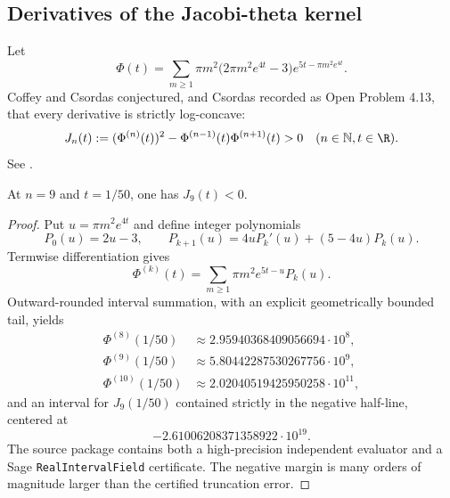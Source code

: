 \subsection{Derivatives of the Jacobi-theta kernel}

Let
\[
\Phi(t)=\sum_{m\ge1}\pi m^2\bigl(2\pi m^2e^{4t}-3\bigr)e^{5t-\pi m^2e^{4t}}.
\]
Coffey and Csordas conjectured, and Csordas recorded as Open Problem 4.13, that every derivative is strictly log-concave:
\[
J_n(t):=(\Phi^{(n)}(t))^2-\Phi^{(n-1)}(t)\Phi^{(n+1)}(t)>0
\quad(n\in\mathbb N,t\in\R).
\]
See \cite{Csordas2014}.

\begin{theorem}\label{thm:theta}
At $n=9$ and $t=1/50$, one has $J_9(t)<0$.
\end{theorem}
\begin{proof}
Put $u=\pi m^2e^{4t}$ and define integer polynomials
\[
P_0(u)=2u-3,\qquad P_{k+1}(u)=4uP_k'(u)+(5-4u)P_k(u).
\]
Termwise differentiation gives
\[
\Phi^{(k)}(t)=\sum_{m\ge1}\pi m^2e^{5t-u}P_k(u).
\]
Outward-rounded interval summation, with an explicit geometrically bounded tail, yields
\begin{align*}
\Phi^{(8)}(1/50)&\approx 2.95940368409056694\cdot10^8,\\
\Phi^{(9)}(1/50)&\approx 5.80442287530267756\cdot10^9,\\
\Phi^{(10)}(1/50)&\approx 2.02040519425950258\cdot10^{11},
\end{align*}
and an interval for $J_9(1/50)$ contained strictly in the negative half-line, centered at
\[
-2.61006208371358922\cdot10^{19}.
\]
The source package contains both a high-precision independent evaluator and a Sage \texttt{RealIntervalField} certificate.  The negative margin is many orders of magnitude larger than the certified truncation error.
\end{proof}
